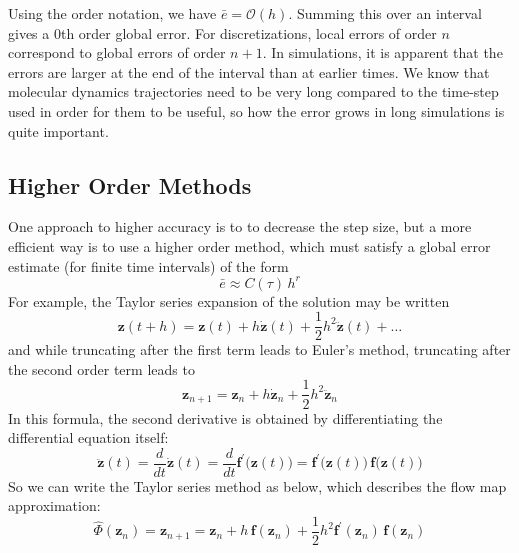 \documentclass{article}
\begin{document}
    Using the order notation, we have $\bar{e} = \mathcal{O}(h)$. Summing this over an interval gives a $0$th order global error. For discretizations, local errors of order $n$ correspond to global errors of order $n+1$. In simulations, it is apparent that the errors are larger at the end of the interval than at earlier times. We know that molecular dynamics trajectories need to be very long compared to the time-step used in order for them to be useful, so how the error grows in long simulations is quite important. 

  \subsection{Higher Order Methods}

    One approach to higher accuracy is to to decrease the step size, but a more efficient way is to use a higher order method, which must satisfy a global error estimate (for finite time intervals) of the form 
    \begin{equation}
      \bar{e} \approx C(\tau) \, h ^r
    \end{equation}
    For example, the Taylor series expansion of the solution may be written 
    \begin{equation}
      \mathbf{z}(t + h) = \mathbf{z}(t) + h \boldsymbol{\dot{z}} (t) + \frac{1}{2} h^2 \boldsymbol{\ddot{z}}(t) + \ldots
    \end{equation}
    and while truncating after the first term leads to Euler's method, truncating after the second order term leads to 
    \begin{equation}
      \mathbf{z}_{n+1} = \mathbf{z}_n + h\boldsymbol{\dot{z}}_n + \frac{1}{2} h^2 \boldsymbol{\ddot{z}}_n
    \end{equation}
    In this formula, the second derivative is obtained by differentiating the differential equation itself: 
    \begin{equation}
      \boldsymbol{\ddot{z}}(t) = \frac{d}{dt} \boldsymbol{\dot{z}}(t) = \frac{d}{dt} \mathbf{f}^\prime \big( \mathbf{z}(t)\big) = \mathbf{f}^\prime\big( \mathbf{z}(t)\big) \, \mathbf{f}\big(\mathbf{z}(t)\big)
    \end{equation}
    So we can write the Taylor series method as below, which describes the flow map approximation: 
    \begin{equation}
      \hat{\Phi} (\mathbf{z}_{n}) = \mathbf{z}_{n+1} = \mathbf{z}_n + h\, \mathbf{f}(\mathbf{z}_n) + \frac{1}{2} h^2 \mathbf{f}^\prime (\mathbf{z}_n) \, \mathbf{f}(\mathbf{z}_n)
    \end{equation}
\end{document}
